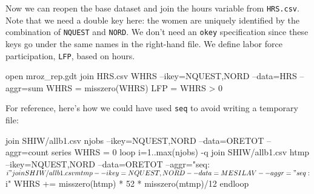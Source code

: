 Now we can reopen the base dataset and join the hours variable from
\texttt{HRS.csv}.  Note that we need a double key here: the women are
uniquely identified by the combination of \texttt{NQUEST} and
\texttt{NORD}. We don't need an \texttt{okey} specification since
these keys go under the same names in the right-hand file. We define
labor force participation, \texttt{LFP}, based on hours.
%
\begin{code}
open mroz_rep.gdt
join HRS.csv WHRS --ikey=NQUEST,NORD --data=HRS --aggr=sum
WHRS = misszero(WHRS)
LFP = WHRS > 0
\end{code}
%
For reference, here's how we could have used \texttt{seq} to avoid
writing a temporary file:
%
\begin{code}
join SHIW/allb1.csv njobs --ikey=NQUEST,NORD --data=ORETOT --aggr=count
series WHRS = 0
loop i=1..max(njobs) -q
  join SHIW/allb1.csv htmp --ikey=NQUEST,NORD --data=ORETOT --aggr="seq:$i"
  join SHIW/allb1.csv mtmp --ikey=NQUEST,NORD --data=MESILAV --aggr="seq:$i"
  WHRS += misszero(htmp) * 52 * misszero(mtmp)/12 
endloop
\end{code}

